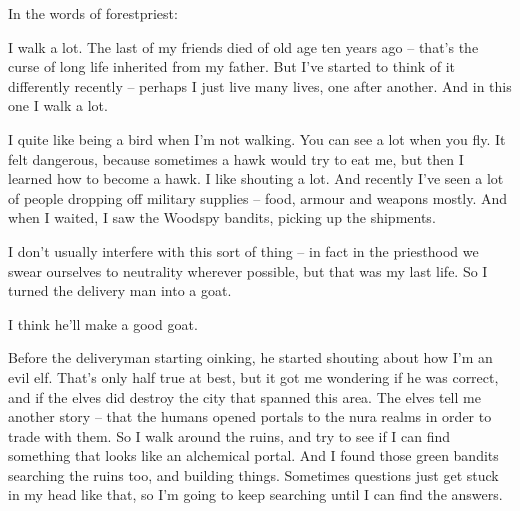 \begin{multicols}{2}
\begin{exampletext}
\end{exampletext}

In the words of \gls{forestpriest}:

\begin{exampletext}

  I walk a lot.
  The last of my friends died of old age ten years ago -- that's the curse of long life inherited from my father.
  But I've started to think of it differently recently -- perhaps I just live many lives, one after another.
  And in this one I walk a lot.

  I quite like being a bird when I'm not walking.
  You can see a lot when you fly.
  It felt dangerous, because sometimes a hawk would try to eat me, but then I learned how to become a hawk.
  I like shouting a lot.
  And recently I've seen a lot of people dropping off military supplies -- food, armour and weapons mostly.
  And when I waited, I saw the Woodspy bandits, picking up the shipments.
  
  I don't usually interfere with this sort of thing -- in fact in the priesthood we swear ourselves to neutrality wherever possible, but that was my last life.
  So I turned the delivery man into a goat.

  I think he'll make a good goat.

  Before the deliveryman starting oinking, he started shouting about how I'm an evil elf.
  That's only half true at best, but it got me wondering if he was correct, and if the elves did destroy the city that spanned this area.
  The elves tell me another story -- that the humans opened portals to the nura realms in order to trade with them.
  So I walk around the ruins, and try to see if I can find something that looks like an alchemical portal.
  And I found those green bandits searching the ruins too, and building things.
  Sometimes questions just get stuck in my head like that, so I'm going to keep searching until I can find the answers.

\end{exampletext}

\end{multicols}
